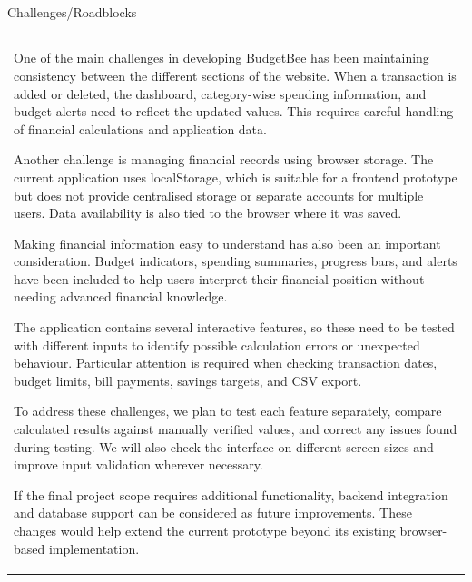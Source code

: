 \documentclass[12pt,a4paper]{article}
\newcommand{\sectiontitle}[1]{%
    {\color{GEUBlue}
    \fontsize{18}{22}\selectfont #1}
}
\newcommand{\answerbox}[2]{%
    \begin{tabularx}{\textwidth}{
        |>{\raggedright\arraybackslash}X|}
        \hline
        \parbox[t][#1][t]{\dimexpr\linewidth-12pt\relax}{
            \vspace{5pt}
            \fontsize{11}{13}\selectfont #2
        }\\
        \hline
    \end{tabularx}
}
\begin{document}
\newpage


\vspace*{0.20cm}


\sectiontitle{Challenges/Roadblocks}

\vspace{0.18cm}

\answerbox{9.35cm}{One of the main challenges in developing BudgetBee has been maintaining consistency between the different sections of the website. When a transaction is added or deleted, the dashboard, category-wise spending information, and budget alerts need to reflect the updated values. This requires careful handling of financial calculations and application data.

Another challenge is managing financial records using browser storage. The current application uses localStorage, which is suitable for a frontend prototype but does not provide centralised storage or separate accounts for multiple users. Data availability is also tied to the browser where it was saved.

Making financial information easy to understand has also been an important consideration. Budget indicators, spending summaries, progress bars, and alerts have been included to help users interpret their financial position without needing advanced financial knowledge.

The application contains several interactive features, so these need to be tested with different inputs to identify possible calculation errors or unexpected behaviour. Particular attention is required when checking transaction dates, budget limits, bill payments, savings targets, and CSV export.

To address these challenges, we plan to test each feature separately, compare calculated results against manually verified values, and correct any issues found during testing. We will also check the interface on different screen sizes and improve input validation wherever necessary.

If the final project scope requires additional functionality, backend integration and database support can be considered as future improvements. These changes would help extend the current prototype beyond its existing browser-based implementation.}

\vspace{1.70cm}
\end{document}
